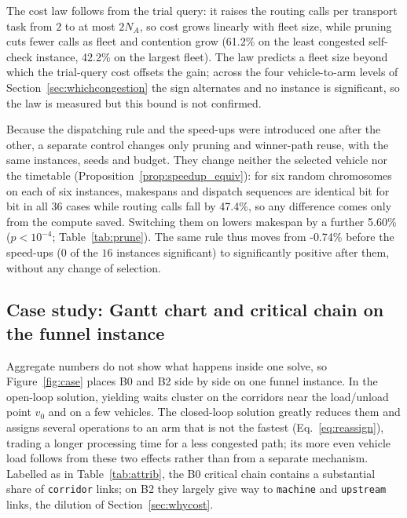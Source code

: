 \documentclass[manuscript,screen,review]{acmart}
\newcommand{\RouteCallCutLo}{42.2\%}     %
\newcommand{\RouteCallCutHi}{61.2\%}     %
\newcommand{\RouteCallCut}{47.4\%}
\newcommand{\GainPrune}{5.60\%}
\newcommand{\PPrune}{<10^{-4}}
\newcommand{\MatrixCells}{16}
\newcommand{\GainProbePre}{-0.74\%}      %
\begin{document}
The cost law follows from the trial query: it raises the routing calls per transport task from $2$ to at most $2N_A$, so cost grows linearly with fleet size, while pruning cuts fewer calls as fleet and contention grow (\RouteCallCutHi{} on the least congested self-check instance, \RouteCallCutLo{} on the largest fleet). The law predicts a fleet size beyond which the trial-query cost offsets the gain; across the four vehicle-to-arm levels of Section~\ref{sec:whichcongestion} the sign alternates and no instance is significant, so the law is measured but this bound is not confirmed.

Because the dispatching rule and the speed-ups were introduced one after the other, a separate control changes only pruning and winner-path reuse, with the same instances, seeds and budget. They change neither the selected vehicle nor the timetable (Proposition~\ref{prop:speedup_equiv}): for six random chromosomes on each of six instances, makespans and dispatch sequences are identical bit for bit in all $36$ cases while routing calls fall by \RouteCallCut{}, so any difference comes only from the compute saved. Switching them on lowers makespan by a further \GainPrune{} ($p\PPrune$; Table~\ref{tab:prune}). The same rule thus moves from \GainProbePre{} before the speed-ups ($0$ of the $\MatrixCells$ instances significant) to significantly positive after them, without any change of selection.

\begin{table}[t]
\caption{Pruning and winner-path reuse off versus on (bold: adopted setting). Same instances, seeds and wall-clock time; $n=60$ pairs, two-sided Wilcoxon signed-rank test ($^{***}p<0.001$). Ratios take the off value as denominator.}
\label{tab:prune}
\small

\end{table}

\subsection{Case study: Gantt chart and critical chain on the funnel instance}
\label{sec:casestudy}

Aggregate numbers do not show what happens inside one solve, so Figure~\ref{fig:case} places B0 and B2 side by side on one funnel instance.
In the open-loop solution, yielding waits cluster on the corridors near the load/unload point $v_0$ and on a few vehicles. The closed-loop solution greatly reduces them and assigns several operations to an arm that is not the fastest (Eq.~\eqref{eq:reassign}), trading a longer processing time for a less congested path; its more even vehicle load follows from these two effects rather than from a separate mechanism.
Labelled as in Table~\ref{tab:attrib}, the B0 critical chain contains a substantial share of \texttt{corridor} links; on B2 they largely give way to \texttt{machine} and \texttt{upstream} links, the dilution of Section~\ref{sec:whycost}.
\end{document}
